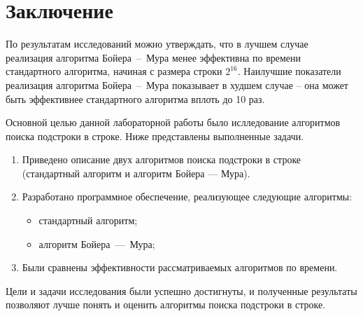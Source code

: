\chapter*{Заключение}

По результатам исследований можно утверждать, что в лучшем случае реализация алгоритма Бойера~--~Мура менее эффективна по времени стандартного алгоритма, начиная с размера строки $2^{16}$.
Наилучшие показатели реализация алгоритма Бойера~--~Мура показывает в худшем случае -- она может быть эффективнее стандартного алгоритма вплоть до 10 раз.

Основной целью данной лабораторной работы было ислледование алгоритмов поиска подстроки в строке.
Ниже представлены выполненные задачи.

\begin{enumerate}[label={\arabic*)}]
    \item Приведено описание двух алгоритмов поиска подстроки в строке (стандартный алгоритм и алгоритм Бойера --- Мура).
    \item Разработано программное обеспечение, реализующее следующие алгоритмы:
    \begin{itemize}[label=---]
    \item стандартный алгоритм;
    \item алгоритм Бойера~---~Мура;
    \end{itemize}
    \item Были сравнены эффективности рассматриваемых алгоритмов по времени.
    \end{enumerate}
Цели и задачи исследования были успешно достигнуты, и полученные результаты позволяют лучше понять и оценить алгоритмы поиска подстроки в строке.